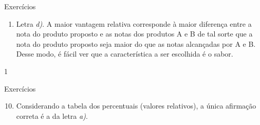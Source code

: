 {\begin{answer}{Exercícios}
{\begin{enumerate}
  \item Letra \textit{d)}. A maior vantagem relativa corresponde à maior diferença entre a nota do produto proposto e as notas dos produtos A e B de tal sorte que a nota do produto proposto seja maior do que as notas alcançadas por A e B. Desse modo, é fácil ver que a característica a ser escolhida é o sabor.
  \end{enumerate}
}{1}
\end{answer}
\clearmargin
\begin{answer}{Exercícios}
{\exerciselist
  \begin{enumerate}\setcounter{enumi}{9}
  \item Considerando a tabela dos percentuais (valores relativos), a única afirmação correta é a da letra \textit{a)}. 

\begin{table}[H]
\centering


\end{table}
\end{enumerate}}
\end{answer}}
